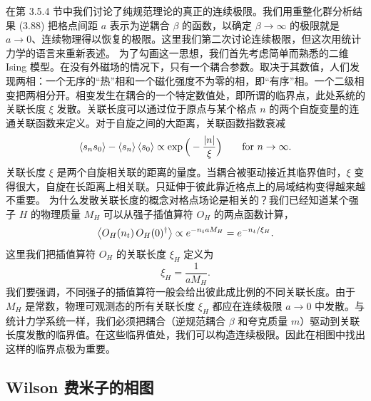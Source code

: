 在第 3.5.4 节中我们讨论了纯规范理论的真正的连续极限。我们用重整化群分析结果 (3.88) 把格点间距 $a$ 表示为逆耦合 $\beta$ 的函数，以确定 $\beta \to \infty$ 的极限就是 $a \to 0$、连续物理得以恢复的极限。这里我们第二次讨论连续极限，但这次用统计力学的语言来重新表述。
为了勾画这一思想，我们首先考虑简单而熟悉的二维 Ising 模型。在没有外磁场的情况下，只有一个耦合参数。取决于其数值，人们发现两相：一个无序的``热''相和一个磁化强度不为零的相，即``有序''相。一个二级相变把两相分开。相变发生在耦合的一个特定数值处，即所谓的临界点，此处系统的关联长度 $\xi$ 发散。关联长度可以通过位于原点与某个格点 $n$ 的两个自旋变量的连通关联函数来定义。对于自旋之间的大距离，关联函数指数衰减
\begin{equation}
\left\langle s_ns_0 \right\rangle - \left\langle s_n \right\rangle\left\langle s_0 \right\rangle \propto \exp\Big(-\frac{|n|}{\xi}\Big)
\qquad \text{for } n \to \infty.
\end{equation}
关联长度 $\xi$ 是两个自旋相关联的距离的量度。当耦合被驱动接近其临界值时，$\xi$ 变得很大，自旋在长距离上相关联。只延伸于彼此靠近格点上的局域结构变得越来越不重要。
为什么发散关联长度的概念对格点场论是相关的？我们已经知道某个强子 $H$ 的物理质量 $M_H$ 可以从强子插值算符 $O_H$ 的两点函数计算，
\begin{equation}
\left\langle O_H(n_t)\,O_H(0)^\dagger \right\rangle \propto e^{-n_t a M_H} = e^{-n_t/\xi_H}.
\end{equation}
这里我们把插值算符 $O_H$ 的关联长度 $\xi_H$ 定义为
\begin{equation}
\xi_H = \frac{1}{aM_H}.
\end{equation}
我们要强调，不同强子的插值算符一般会给出彼此成比例的不同关联长度。由于 $M_H$ 是常数，物理可观测态的所有关联长度 $\xi_H$ 都应在连续极限 $a \to 0$ 中发散。与统计力学系统一样，我们必须把耦合（逆规范耦合 $\beta$ 和夸克质量 $m$）驱动到关联长度发散的临界值。在这些临界值处，我们可以构造连续极限。因此在相图中找出这样的临界点极为重要。

\subsection{Wilson 费米子的相图}

